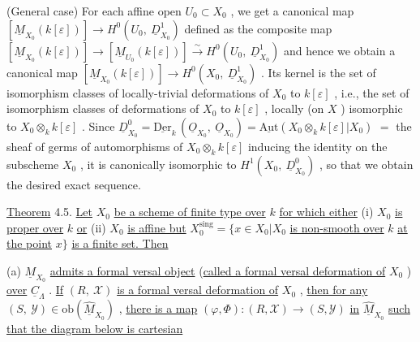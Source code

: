 (General case)  For each affine open  $U_{0} \subset X_{0}$ , we get a canonical map $[\underline{M}_{X_{0}}(k[\varepsilon])] \to H^{0}(U_{0},\ \underline{D}^{1}_{X_{0}})$  defined as the composite map $[\underline{M}_{X_{0}}(k[\varepsilon])] \to [\underline{M}_{U_{0}}(k[\varepsilon])] \overset{\sim}{\longrightarrow} H^{0}(U_{0},\ \underline{D}^{1}_{X_{0}})$  and hence we obtain a canonical map $[\underline{M}_{X_{0}}(k[\varepsilon])] \to H^{0}(X_{0},\ \underline{D}^{1}_{X_{0}})$ . Its kernel is the set of isomorphism classes of locally-trivial deformations of  $X_{0}$  to  $k[\varepsilon]$ , i.e., the set of isomorphism classes of deformations of  $X_{0}$  to  $k[\varepsilon]$ , locally (on $X$ ) isomorphic to $X_{0} \otimes_{k} k[\varepsilon]$ . Since  $\underline{D}^{0}_{X_{0}} = \underline{\mathrm{Der}}_{k}\,(\underline{O}_{X_{0}},\ \underline{O}_{X_{0}}) = \underline{\mathrm{Aut}}(X_{0} \otimes_{k} k[\varepsilon]|X_{0})$  $=$ the sheaf of germs of automorphisms of  $X_{0} \otimes_{k} k[\varepsilon]$  inducing the identity on the subscheme $X_{0}$ , it is canonically isomorphic to  $H^{1}(X_{0},\ \underline{D}^{0}_{X_{0}})$ , so that we obtain the desired exact sequence.

\underline{Theorem} 4.5.  \underline{Let} $X_{0}$ \underline{be a scheme of finite type over} $k$ \underline{for which either} (i) $X_{0}$ \underline{is proper over} $k$ \underline{or} (ii) $X_{0}$ \underline{is affine but} $X_{0}^{\mathrm{sing}} = \{x \in X_{0}|X_{0}$ \underline{is non-smooth over} $k$ \underline{at the point} $x \}$ \underline{is a finite set. Then}

(a)  $\underline{M}_{X_{0}}$  \underline{admits a formal versal object} (\underline{called a formal versal deformation of}  $X_{0}$ ) \underline{over}  $\underline{C}_{\Lambda}$ . \underline{If}  $(R,\ \mathcal{X})$  \underline{is a formal versal deformation of}  $X_{0}$ , \underline{then for any} $(S,\ \mathcal{Y}) \in \mathrm{ob}(\widehat{\underline{M}}_{X_{0}})$ , \underline{there is a map}  $(\varphi,\Phi) : (R,\mathcal{X}) \to (S,\mathcal{Y})$  \underline{in}  $\widehat{\underline{M}}_{X_{0}}$  \underline{such that the diagram below is cartesian}


